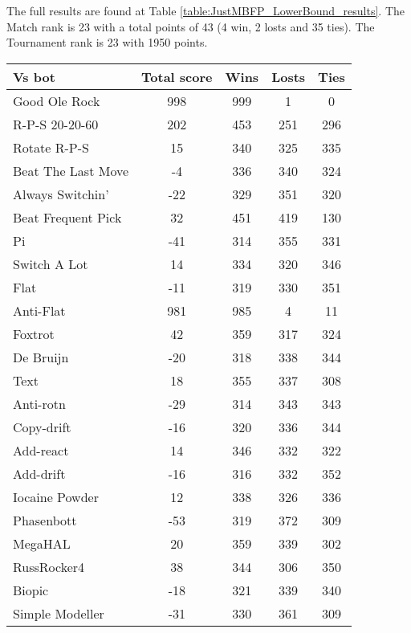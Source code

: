 The full results are found at Table \ref{table:JustMBFP_LowerBound_results}. The Match rank is 23 with a total points of 43 (4 win, 2 losts and 35 ties). The Tournament rank is 23 with 1950 points.

\begin{table*}
    \caption{JustMBFP_LowerBound results}
    \label{table:JustMBFP_LowerBound_results}
    \centering
    \begin{tabular}{|l|c|c|c|c|}
        \hline
        \textbf{Vs bot} & \textbf{Total score} & \textbf{Wins} & \textbf{Losts} & \textbf{Ties} \\ \hline
Good Ole Rock & 998 & 999 & 1 & 0 \\ \hline 
R-P-S 20-20-60 & 202 & 453 & 251 & 296 \\ \hline 
Rotate R-P-S & 15 & 340 & 325 & 335 \\ \hline 
Beat The Last Move & -4 & 336 & 340 & 324 \\ \hline 
Always Switchin' & -22 & 329 & 351 & 320 \\ \hline 
Beat Frequent Pick & 32 & 451 & 419 & 130 \\ \hline 
Pi & -41 & 314 & 355 & 331 \\ \hline 
Switch A Lot & 14 & 334 & 320 & 346 \\ \hline 
Flat & -11 & 319 & 330 & 351 \\ \hline 
Anti-Flat & 981 & 985 & 4 & 11 \\ \hline 
Foxtrot & 42 & 359 & 317 & 324 \\ \hline 
De Bruijn & -20 & 318 & 338 & 344 \\ \hline 
Text & 18 & 355 & 337 & 308 \\ \hline 
Anti-rotn & -29 & 314 & 343 & 343 \\ \hline 
Copy-drift & -16 & 320 & 336 & 344 \\ \hline 
Add-react & 14 & 346 & 332 & 322 \\ \hline 
Add-drift & -16 & 316 & 332 & 352 \\ \hline 
Iocaine Powder & 12 & 338 & 326 & 336 \\ \hline 
Phasenbott & -53 & 319 & 372 & 309 \\ \hline 
MegaHAL & 20 & 359 & 339 & 302 \\ \hline 
RussRocker4 & 38 & 344 & 306 & 350 \\ \hline 
Biopic & -18 & 321 & 339 & 340 \\ \hline 
Simple Modeller & -31 & 330 & 361 & 309 \\ \hline 

\end{tabular}
\end{table*}
